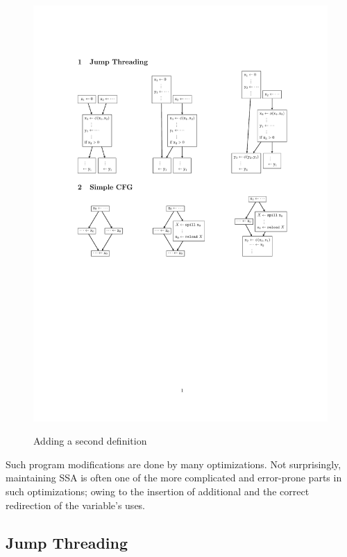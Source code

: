 \begin{figure}[htbp]
{		\includegraphics[scale=1.0]{spill_recons.pdf}
	}
	\label{fig:ex1}
	\caption{Adding a second definition}
\end{figure}


Such program modifications are done by many optimizations. 
Not surprisingly, maintaining SSA is often one of the more complicated and error-prone parts in such optimizations;
owing to the insertion of additional \phifuns and the correct redirection of the variable's uses.

\subsection{Jump Threading}

